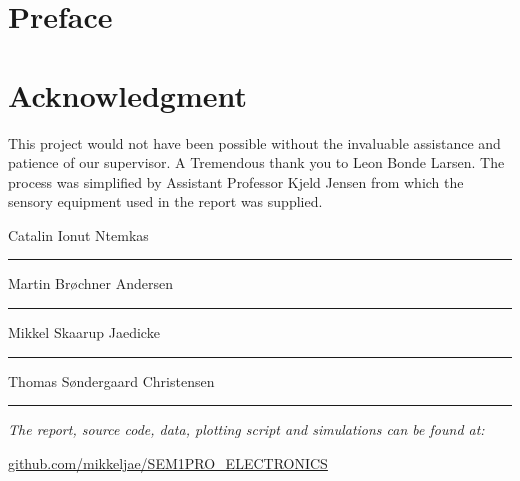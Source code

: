 \section*{Preface}

\section*{Acknowledgment}
This project would not have been possible without the invaluable assistance and patience of our supervisor. 
A Tremendous thank you to Leon Bonde Larsen.
The process was simplified by Assistant Professor Kjeld Jensen from which the sensory equipment used in the report was supplied.
\vspace{5cm}
\begin{center}
	\begin{minipage}[t]{.55\textwidth}\large
		\begin{center}
		Catalin Ionut Ntemkas\\
		\vspace{1cm}
		\hrule
		\vspace{0.5cm}
		Martin Brøchner Andersen\\
		\vspace{1cm}
		\hrule
		\vspace{0.5cm}
		Mikkel Skaarup Jaedicke\\
		\vspace{1cm}
		\hrule
		\vspace{0.5cm}
		Thomas Søndergaard Christensen
		\vspace{1cm}
		\hrule
		\end{center} 
	\end{minipage}
\end{center}

\vspace{1.2cm}
  \begin{center}
    \textsl{The report, source code, data, plotting script and simulations can be found at:}  
    \end{center}
    \vspace{-5pt}
    \begin{center}
	\renewcommand{\UrlFont}{\color{black}\normalsize\tt}
    \url{github.com/mikkeljae/SEM1PRO_ELECTRONICS}
   \end{center}
\newpage

